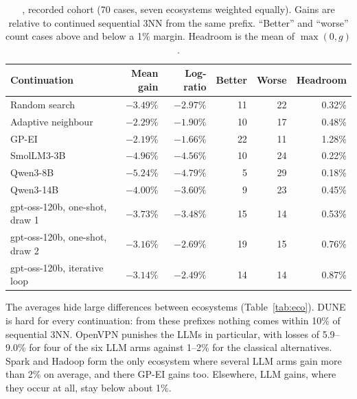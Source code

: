 \begin{table}[t]
\centering
\caption{, recorded cohort (70 cases, seven ecosystems weighted equally). Gains are relative to continued sequential 3NN from the same prefix. ``Better'' and ``worse'' count cases above and below a 1\% margin. Headroom is the mean of $\max(0,g)$.}
\label{tab:rq1}
\small
\begin{tabular}{lrrrrr}
\toprule
Continuation & Mean gain & Log-ratio & Better & Worse & Headroom \\
\midrule
Random search & $-3.49\%$ & $-2.97\%$ & 11 & 22 & 0.32\% \\
Adaptive neighbour & $-2.29\%$ & $-1.90\%$ & 10 & 17 & 0.48\% \\
GP-EI & $-2.19\%$ & $-1.66\%$ & 22 & 11 & 1.28\% \\
\midrule
SmolLM3-3B & $-4.96\%$ & $-4.56\%$ & 10 & 24 & 0.22\% \\
Qwen3-8B & $-5.24\%$ & $-4.79\%$ & 5 & 29 & 0.18\% \\
Qwen3-14B & $-4.00\%$ & $-3.60\%$ & 9 & 23 & 0.45\% \\
gpt-oss-120b, one-shot, draw 1 & $-3.73\%$ & $-3.48\%$ & 15 & 14 & 0.53\% \\
gpt-oss-120b, one-shot, draw 2 & $-3.16\%$ & $-2.69\%$ & 19 & 15 & 0.76\% \\
gpt-oss-120b, iterative loop & $-3.14\%$ & $-2.49\%$ & 14 & 14 & 0.87\% \\
\bottomrule
\end{tabular}
\end{table}

The averages hide large differences between ecosystems (Table~\ref{tab:eco}). DUNE is hard for every continuation: from these prefixes nothing comes within 10\% of sequential 3NN. OpenVPN punishes the LLMs in particular, with losses of 5.9--9.0\% for four of the six LLM arms against 1--2\% for the classical alternatives. Spark and Hadoop form the only ecosystem where several LLM arms gain more than 2\% on average, and there GP-EI gains too. Elsewhere, LLM gains, where they occur at all, stay below about 1\%.

